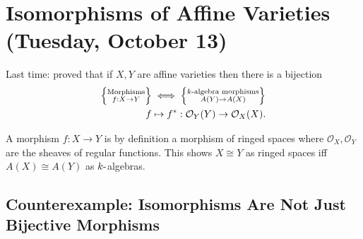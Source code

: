\hypertarget{isomorphisms-of-affine-varieties-tuesday-october-13}{%
\section{Isomorphisms of Affine Varieties (Tuesday, October
13)}\label{isomorphisms-of-affine-varieties-tuesday-october-13}}

Last time: proved that if \(X, Y\) are affine varieties then there is a
bijection
\begin{align*}  
\left\{{\substack{\text{Morphisms} \\ f:X\to Y}}\right\}
&\iff
\left\{{\substack{\text{$k{\hbox{-}}$algebra morphisms}\\ A(Y) \to A(X)}}\right\}
\\
f & \mapsto f^*: {\mathcal{O}}_Y(Y) \to {\mathcal{O}}_X(X)
.\end{align*}

\begin{remark}

A morphism \(f:X\to Y\) is by definition a morphism of ringed spaces
where \({\mathcal{O}}_X, {\mathcal{O}}_Y\) are the sheaves of regular
functions. This shows \(X\cong Y\) as ringed spaces iff
\(A(X) \cong A(Y)\) as \(k{\hbox{-}}\)algebras.

\end{remark}

\hypertarget{counterexample-isomorphisms-are-not-just-bijective-morphisms}{%
\subsection{Counterexample: Isomorphisms Are Not Just Bijective
Morphisms}\label{counterexample-isomorphisms-are-not-just-bijective-morphisms}}

